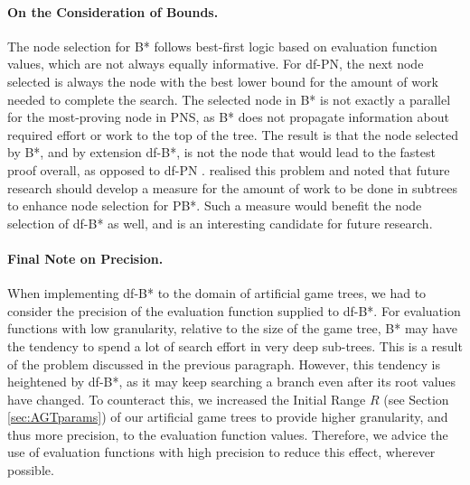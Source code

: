 \paragraph{On the Consideration of Bounds.}
The node selection for B* follows best-first logic based on evaluation function values, which are not always equally informative. For df-PN, the next node selected is always the node with the best lower bound for the amount of work needed to complete the search. The selected node in B* is not exactly a parallel for the most-proving node in PNS, as B* does not propagate information about required effort or work to the top of the tree. The result is that the node selected by B*, and by extension df-B*, is not the node that would lead to the fastest proof overall, as opposed to df-PN \cite{Nagai2002}.  realised this problem and noted that future research should develop a measure for the amount of work to be done in subtrees to enhance node selection for PB*. Such a measure would benefit the node selection of df-B* as well, and is an interesting candidate for future research.

\paragraph{Final Note on Precision.}
When implementing df-B* to the domain of artificial game trees, we had to consider the precision of the evaluation function supplied to df-B*. For evaluation functions with low granularity, relative to the size of the game tree, B* may have the tendency to spend a lot of search effort in very deep sub-trees. This is a result of the problem discussed in the previous paragraph. However, this tendency is heightened by df-B*, as it may keep searching a branch even after its root values have changed. To counteract this, we increased the Initial Range $R$ (see Section \ref{sec:AGTparams}) of our artificial game trees to provide higher granularity, and thus more precision, to the evaluation function values. Therefore, we advice the use of evaluation functions with high precision to reduce this effect, wherever possible.

